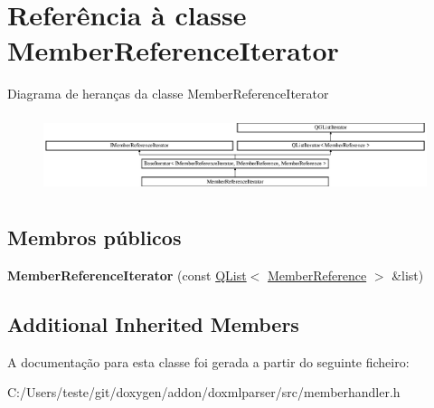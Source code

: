 \hypertarget{class_member_reference_iterator}{\section{Referência à classe Member\-Reference\-Iterator}
\label{class_member_reference_iterator}
}
Diagrama de heranças da classe Member\-Reference\-Iterator\begin{figure}[H]
\begin{center}
\leavevmode
\includegraphics[height=2.281059cm]{class_member_reference_iterator}
\end{center}
\end{figure}
\subsection*{Membros públicos}
\begin{DoxyCompactItemize}
\item 
\hypertarget{class_member_reference_iterator_ac0ef9735f15891ce56ab0322d3a7b518}{{\bfseries Member\-Reference\-Iterator} (const \hyperlink{class_q_list}{Q\-List}$<$ \hyperlink{class_member_reference}{Member\-Reference} $>$ \&list)}\label{class_member_reference_iterator_ac0ef9735f15891ce56ab0322d3a7b518}

\end{DoxyCompactItemize}
\subsection*{Additional Inherited Members}


A documentação para esta classe foi gerada a partir do seguinte ficheiro\-:\begin{DoxyCompactItemize}
\item 
C\-:/\-Users/teste/git/doxygen/addon/doxmlparser/src/memberhandler.\-h\end{DoxyCompactItemize}
